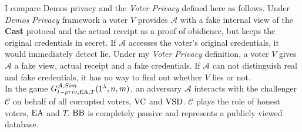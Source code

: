 I compare Demos privacy and the \textit{Voter Privacy} defined here as follows. Under \textit{Demos Privacy} framework a voter $V$ provides $\mathcal{A}$  with a fake internal view of the \textbf{Cast} protocol and the actual receipt as a proof of obidience, but keeps the original credentials in secret. If $\mathcal{A}$ accesses the voter's original credentials, it would immediately detect lie. Under my \textit{Voter Privacy} definition, a voter $V$ gives $\mathcal{A}$ a fake view, actual receipt and a fake credentials. If $\mathcal{A}$ can not distinguish real and fake credentials, it has no way to find out whether $V$ lies or not. \\
 
In the game $G_{t-priv,\operatorname{EA},T}^{\mathcal{A}, Sim}(1^{\lambda},n,m)$, an adversary $\mathcal{A}$ interacts with the challenger $\mathcal{C}$ on behalf of all corrupted voters, $\operatorname{VC}$ and $\operatorname{VSD}$. $\mathcal{C}$ plays the role of honest voters, $\operatorname{EA}$ and $T$. $\operatorname{BB}$ is completely passive and represents a publicly viewed database. \\

